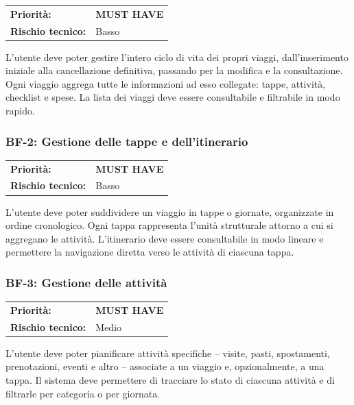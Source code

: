 \documentclass[12pt, a4paper]{article}
\newcommand{\MUST}{\colorbox{musthave}{\small\textbf{MUST HAVE}}}
\newcommand{\RISKL}{\colorbox{risklow}{\small Basso}}
\newcommand{\RISKM}{\colorbox{riskmed}{\small Medio}}
\begin{document}
\begin{tabular}{@{}ll@{}}
  \toprule
  \textbf{Priorità:}        & \MUST \\
  \textbf{Rischio tecnico:} & \RISKL \\
  \bottomrule
\end{tabular}

\medskip
\noindent
L'utente deve poter gestire l'intero ciclo di vita dei propri viaggi, dall'inserimento
iniziale alla cancellazione definitiva, passando per la modifica e la consultazione.
Ogni viaggio aggrega tutte le informazioni ad esso collegate: tappe, attività, checklist
e spese. La lista dei viaggi deve essere consultabile e filtrabile in modo rapido.

\subsubsection{BF-2: Gestione delle tappe e dell'itinerario}

\begin{tabular}{@{}ll@{}}
  \toprule
  \textbf{Priorità:}        & \MUST \\
  \textbf{Rischio tecnico:} & \RISKL \\
  \bottomrule
\end{tabular}

\medskip
\noindent
L'utente deve poter suddividere un viaggio in tappe o giornate, organizzate in ordine
cronologico. Ogni tappa rappresenta l'unità strutturale attorno a cui si aggregano le
attività. L'itinerario deve essere consultabile in modo lineare e permettere la navigazione
diretta verso le attività di ciascuna tappa.

\subsubsection{BF-3: Gestione delle attività}

\begin{tabular}{@{}ll@{}}
  \toprule
  \textbf{Priorità:}        & \MUST \\
  \textbf{Rischio tecnico:} & \RISKM \\
  \bottomrule
\end{tabular}

\medskip
\noindent
L'utente deve poter pianificare attività specifiche -- visite, pasti, spostamenti,
prenotazioni, eventi e altro -- associate a un viaggio e, opzionalmente, a una tappa.
Il sistema deve permettere di tracciare lo stato di ciascuna attività e di filtrarle
per categoria o per giornata.
\end{document}
